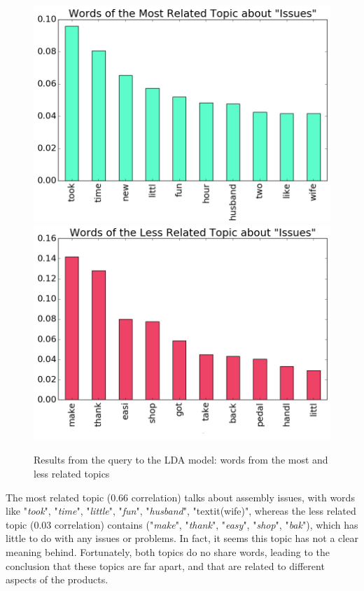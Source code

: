 \begin{figure}
	\caption{Results from the query to the LDA model: words from the most and less related topics}
	\includegraphics[width=1\linewidth]{pdf/Topic/Topic_Modeling_Amazon_Reviews_files/Topic_Modeling_Amazon_Reviews2_42_2}
	\endminipage
	\includegraphics[width=1\linewidth]{pdf/Topic/Topic_Modeling_Amazon_Reviews_files/Topic_Modeling_Amazon_Reviews2_42_1}
	\endminipage
	\\[6pt]
\end{figure}

The most related topic (0.66 correlation) talks about assembly issues, with words like "\textit{took}", "\textit{time}", "\textit{little}", "\textit{fun}", "\textit{husband}", "textit(wife)", whereas the less related topic (0.03 correlation)  contains ("\textit{make}", "\textit{thank}", "\textit{easy}", "\textit{shop}", "\textit{bak}"), which has little to do with any issues or problems. In fact, it seems this topic has not a clear meaning behind.
Fortunately, both topics do no share words, leading to the conclusion that these topics are far apart, and that are related to different aspects of the products.

